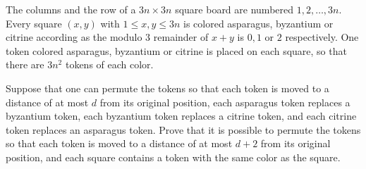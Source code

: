 The columns and the row of a 
$3n \times 3n$
 square board are numbered 
$1,2,\ldots ,3n$.
 Every square 
$(x,y)$
 with 
$1 \leq x,y \leq 3n$
 is colored asparagus, byzantium or citrine according as the modulo 
$3$
 remainder of 
$x+y$
 is 
$0,1$
 or 
$2$
 respectively. One token colored asparagus, byzantium or citrine is placed on each square, so that there are 
$3n^2$
 tokens of each color.


Suppose that one can permute the tokens so that each token is moved to a distance of at most 
$d$
 from its original position, each asparagus token replaces a byzantium token, each byzantium token replaces a citrine token, and each citrine token replaces an asparagus token. Prove that it is possible to permute the tokens so that each token is moved to a distance of at most 
$d+2$
 from its original position, and each square contains a token with the same color as the square.
